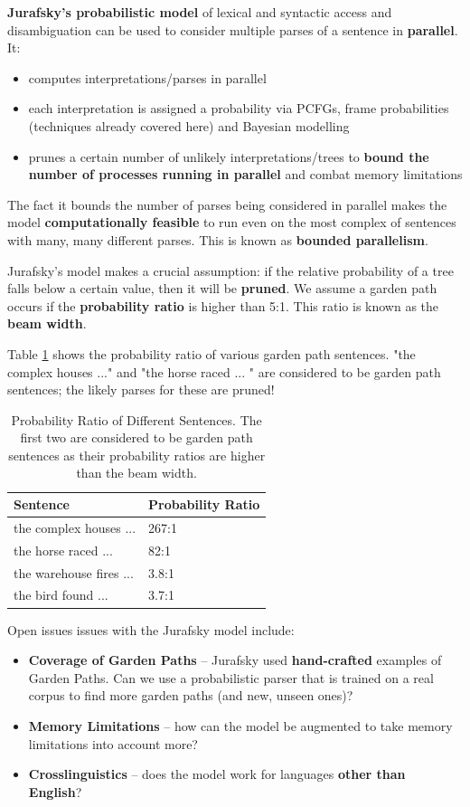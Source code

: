 \documentclass{article}
\begin{document}
\textbf{Jurafsky's probabilistic model} of lexical and syntactic access and disambiguation can be used to consider multiple parses of a sentence in \textbf{parallel}. It:
\begin{itemize}
	\item computes interpretations/parses in parallel
	\item each interpretation is assigned a probability via PCFGs, frame probabilities (techniques already covered here) and Bayesian modelling 
	\item prunes a certain number of unlikely interpretations/trees to \textbf{bound the number of processes running in parallel} and combat memory limitations
\end{itemize}
The fact it bounds the number of parses being considered in parallel makes the model \textbf{computationally feasible} to run even on the most complex of sentences with many, many different parses. This is known as \textbf{bounded parallelism}.

Jurafsky's model makes a crucial assumption: if the relative probability of a tree falls below a certain value, then it will be \textbf{pruned}. We assume a garden path occurs if the \textbf{probability ratio} is higher than 5:1. This ratio is known as the \textbf{beam width}.

Table \ref{tab:beam-width} shows the probability ratio of various garden path sentences. "the complex houses ..." and "the horse raced ... " are considered to be garden path sentences; the likely parses for these are pruned!

\begin{table}
	\centering
	\begin{tabular}{|l|l|}
		\hline
		\textbf{Sentence} & \textbf{Probability Ratio} \\
		\hline
		the complex houses ... & 267:1 \\
		the horse raced ... & 82:1 \\
		\hline
		the warehouse fires ... & 3.8:1 \\
		the bird found ... & 3.7:1 \\
		\hline
	\end{tabular}
	\caption{Probability Ratio of Different Sentences. The first two are considered to be garden path sentences as their probability ratios are higher than the beam width.}
	\label{tab:beam-width}
\end{table}

Open issues issues with the Jurafsky model include:
\begin{itemize}
	\item \textbf{Coverage of Garden Paths} -- Jurafsky used \textbf{hand-crafted} examples of Garden Paths. Can we use a probabilistic parser that is trained on a real corpus to find more garden paths (and new, unseen ones)?
	\item \textbf{Memory Limitations} -- how can the model be augmented to take memory limitations into account more?
	\item \textbf{Crosslinguistics} -- does the model work for languages \textbf{other than English}?
\end{itemize}
\end{document}
